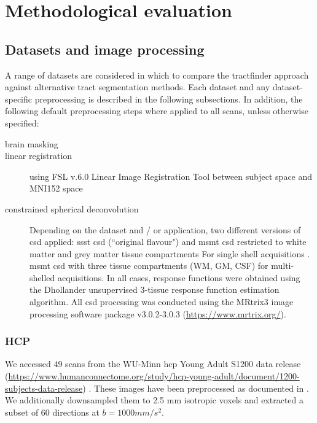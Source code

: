 \chapter{Methodological evaluation}
\label{}


\section{Datasets and image processing}
\label{sec:data}

A range of datasets are considered in which to compare the tractfinder approach against alternative tract segmentation methods.
Each dataset and any dataset-specific preprocessing is described in the following subsections.
In addition, the following default preprocessing steps where applied to all scans, unless otherwise specified:

\begin{description}
  \item[brain masking\autocite{Tournier2019}]
  \item[linear registration] using FSL v.6.0 Linear Image Registration Tool\autocite{Jenkinson2001,Jenkinson2002} between subject space and MNI152\autocite{Fonov2011} space
  \item[constrained spherical deconvolution] Depending on the dataset and / or application, two different versions of \gls{csd} applied: \gls{ssst} \gls{csd} (``original flavour")\autocite{Tournier2007,Tournier2019} and \gls{msmt} \gls{csd}\autocite{Jeurissen2014} restricted to white matter and grey matter tissue compartments For single shell acquisitions . \gls{msmt} \gls{csd} with three tissue compartments (WM, GM, CSF) for multi-shelled acquisitions. In all cases, response functions were obtained using the Dhollander unsupervised 3-tissue response function estimation algorithm.\autocite{Dhollander2016,Dhollander2019}
  All \gls{csd} processing was conducted using the MRtrix3 image processing software package v3.0.2-3.0.3 (\url{https://www.mrtrix.org/}).\autocite{Tournier2019}
\end{description}


\subsection{HCP}

We accessed 49 scans from the WU-Minn \gls{hcp} Young Adult S1200 data release (\url{https://www.humanconnectome.org/study/hcp-young-adult/document/1200-subjects-data-release}) \autocite{VanEssen2013}.
These images have been preprocessed as documented in \textcite{Glasser2013}.
We additionally downsampled them to 2.5 mm isotropic voxels and extracted a subset of 60 directions at $b=1000 mm/s^2$.

